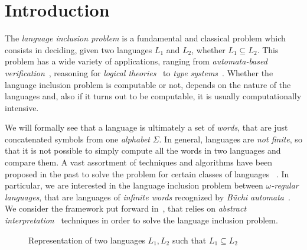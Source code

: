 \chapter{Introduction}
\label{chap:introduction}



The \emph{language inclusion problem} is a fundamental and classical problem
which consists in deciding, given two languages $L_1$ and $L_2$,
whether $L_1 \subseteq L_2$.
This problem has a wide variety of applications, ranging from
\emph{automata-based verification}~\cite{kupferman2018automata},
reasoning for \emph{logical theories}~\cite{esparza2017automata} to
\emph{type systems}~\cite{hofmann2014abstract}.
Whether the language inclusion problem is computable or not, depends on the nature
of the languages and, also if it turns out to be computable, it is usually
computationally intensive.

We will formally see that a language is ultimately a set of \emph{words},
that are just concatenated symbols from one \emph{alphabet} $\Sigma$.
In general, languages are \emph{not finite}, so that it is not possible to simply
compute all the words in two languages and compare them.
A vast assortment of techniques and algorithms have been proposed in the past
to solve the problem for certain classes of languages
~\cite{ganty2019language,ouaknine2004language,abdulla2011advanced}.
In particular, we are interested in the language inclusion problem between
\emph{$\omega$-regular languages}, that are languages of \emph{infinite words}
recognized by \emph{B{\"u}chi automata}~\cite{cohen1977theory}.
We consider the framework put forward in~\cite{ganty2020omegalang}, that
relies on \emph{abstract interpretation}~\cite{cousot1977abstract} techniques
in order to solve the language inclusion problem.

\begin{figure}[h]
	\centering
	\caption{Representation of two languages $L_1,L_2$ such that $L_1 \subseteq L_2$}
\end{figure}

